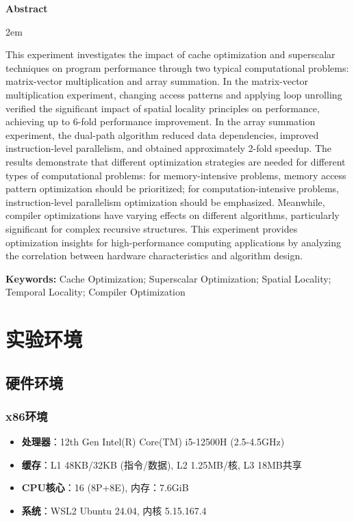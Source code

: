 \documentclass[a4paper,colorlinks=true,linkcolor=blue,urlcolor=blue,citecolor=green,bookmarks=true]{article}
\newenvironment{enabstract}{
    \par\small
    \noindent\mbox{}\par\vspace{-\baselineskip}
    \par\parindent 2em
    }
    {\par\vspace{1em}}
\begin{document}
\begin{center}{\bfseries{Abstract}}\end{center}\par\vspace{0.5em}
\begin{enabstract}
This experiment investigates the impact of cache optimization and superscalar techniques on program performance through two typical computational problems: matrix-vector multiplication and array summation. In the matrix-vector multiplication experiment, changing access patterns and applying loop unrolling verified the significant impact of spatial locality principles on performance, achieving up to 6-fold performance improvement. In the array summation experiment, the dual-path algorithm reduced data dependencies, improved instruction-level parallelism, and obtained approximately 2-fold speedup. The results demonstrate that different optimization strategies are needed for different types of computational problems: for memory-intensive problems, memory access pattern optimization should be prioritized; for computation-intensive problems, instruction-level parallelism optimization should be emphasized. Meanwhile, compiler optimizations have varying effects on different algorithms, particularly significant for complex recursive structures. This experiment provides optimization insights for high-performance computing applications by analyzing the correlation between hardware characteristics and algorithm design.

\vspace{1em}
\noindent\textbf{Keywords:} Cache Optimization; Superscalar Optimization; Spatial Locality; Temporal Locality; Compiler Optimization
\end{enabstract}

\clearpage
\tableofcontents
\clearpage

\section{实验环境}

\subsection{硬件环境}

\subsubsection{x86环境}
\begin{itemize}
  \item \textbf{处理器}：12th Gen Intel(R) Core(TM) i5-12500H (2.5-4.5GHz)
  \item \textbf{缓存}：L1 48KB/32KB (指令/数据), L2 1.25MB/核, L3 18MB共享
  \item \textbf{CPU核心}：16 (8P+8E), 内存：7.6GiB
  \item \textbf{系统}：WSL2 Ubuntu 24.04, 内核 5.15.167.4
\end{itemize}
\end{document}

